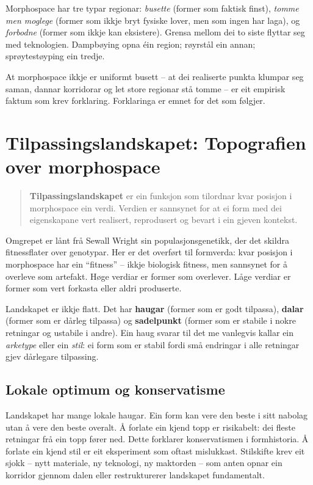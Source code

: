 \documentclass[12pt,a4paper,oneside]{report}
\begin{document}
Morphospace har tre typar regionar: \emph{busette} (former som faktisk finst), \emph{tomme men moglege} (former som ikkje bryt fysiske lover, men som ingen har laga), og \emph{forbodne} (former som ikkje kan eksistere). Grensa mellom dei to siste flyttar seg med teknologien. Dampbøying opna éin region; røyrstål ein annan; sprøytestøyping ein tredje.

At morphospace ikkje er uniformt busett -- at dei realiserte punkta klumpar seg saman, dannar korridorar og let store regionar stå tomme -- er eit empirisk faktum som krev forklaring. Forklaringa er emnet for det som følgjer.

\section{Tilpassingslandskapet: Topografien over morphospace}

\begin{quote}
\textbf{Tilpassingslandskapet} er ein funksjon som tilordnar kvar posisjon i morphospace ein verdi. Verdien er sannsynet for at ei form med dei eigenskapane vert realisert, reprodusert og bevart i ein gjeven kontekst.
\end{quote}

Omgrepet er lånt frå Sewall Wright sin populasjonsgenetikk, der det skildra fitnessflater over genotypar. Her er det overført til formverda: kvar posisjon i morphospace har ein ``fitness'' -- ikkje biologisk fitness, men sannsynet for å overleve som artefakt. Høge verdiar er former som overlever. Låge verdiar er former som vert forkasta eller aldri produserte.

Landskapet er ikkje flatt. Det har \textbf{haugar} (former som er godt tilpassa), \textbf{dalar} (former som er dårleg tilpassa) og \textbf{sadelpunkt} (former som er stabile i nokre retningar og ustabile i andre). Ein haug svarar til det me vanlegvis kallar ein \emph{arketype} eller ein \emph{stil}: ei form som er stabil fordi små endringar i alle retningar gjev dårlegare tilpassing.

\subsection{Lokale optimum og konservatisme}

Landskapet har mange lokale haugar. Ein form kan vere den beste i sitt nabolag utan å vere den beste overalt. Å forlate ein kjend topp er risikabelt: dei fleste retningar frå ein topp fører ned. Dette forklarer konservatismen i formhistoria. Å forlate ein kjend stil er eit eksperiment som oftast mislukkast. Stilskifte krev eit sjokk -- nytt materiale, ny teknologi, ny maktorden -- som anten opnar ein korridor gjennom dalen eller restrukturerer landskapet fundamentalt.
\end{document}
